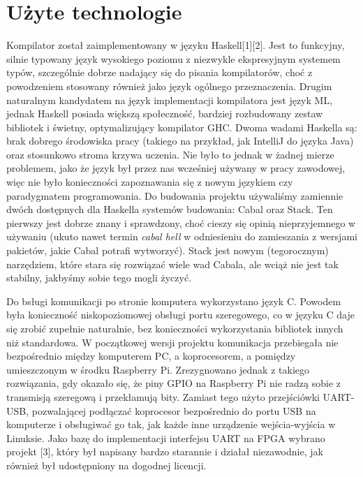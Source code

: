 \section{Użyte technologie}

Kompilator został zaimplementowany w języku Haskell[1][2]. Jest to funkcyjny, silnie typowany język wysokiego poziomu z niezwykle ekspresyjnym systemem typów, szczególnie dobrze nadający się do pisania kompilatorów, choć z powodzeniem stosowany również jako język ogólnego przeznaczenia. Drugim naturalnym kandydatem na język implementacji kompilatora jest język ML, jednak Haskell posiada większą społeczność, bardziej rozbudowany zestaw bibliotek i świetny, optymalizujący kompilator GHC. Dwoma wadami Haskella są: brak dobrego środowiska pracy (takiego na przykład, jak IntelliJ do języka Java) oraz stosunkowo stroma krzywa uczenia. Nie było to jednak w żadnej mierze problemem, jako że język był przez nas wcześniej używany w pracy zawodowej, więc nie było konieczności zapoznawania się z nowym językiem czy paradygmatem programowania. Do budowania projektu używaliśmy zamiennie dwóch dostępnych dla Haskella systemów budowania: Cabal oraz Stack. Ten pierwszy jest dobrze znany i sprawdzony, choć cieszy się opinią nieprzyjemnego w używaniu (ukuto nawet termin \textit{cabal hell} w odniesieniu do zamieszania z wersjami pakietów, jakie Cabal potrafi wytworzyć). Stack jest nowym (tegorocznym) narzędziem, które stara się rozwiązać wiele wad Cabala, ale wciąż nie jest tak stabilny, jakbyśmy sobie tego mogli życzyć.

Do bsługi komunikacji po stronie komputera wykorzystano język C. Powodem była konieczność niskopoziomowej obsługi portu szeregowego, co w języku C daje się zrobić zupełnie naturalnie, bez konieczności wykorzystania bibliotek innych niż standardowa. W początkowej wersji projektu komunikacja przebiegała nie bezpośrednio między komputerem PC, a koprocesorem, a pomiędzy umieszczonym w środku Raspberry Pi. Zrezygnowano jednak z takiego rozwiązania, gdy okazało się, że piny GPIO na Raspberry Pi nie radzą sobie z transmisją szeregową i przekłamują bity. Zamiast tego użyto przejściówki UART-USB, pozwalającej podłączać koprocesor bezpośrednio do portu USB na komputerze i obsługiwać go tak, jak każde inne urządzenie wejścia-wyjścia w Linuksie. Jako bazę do implementacji interfejsu UART na FPGA wybrano projekt [3], który był napisany bardzo starannie i działał niezawodnie, jak również był udostępniony na dogodnej licencji.

